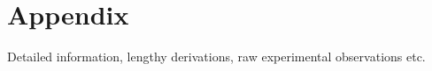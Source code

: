 \appendix
\chapter{Appendix}
Detailed information, lengthy derivations, raw experimental observations etc.

